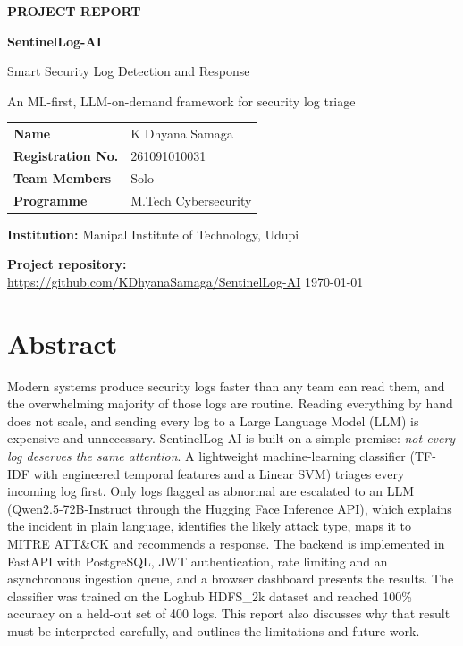 \documentclass[12pt,a4paper]{report}
\begin{document}
\begin{titlepage}
\centering
\vspace*{1.5cm}
{\Large\bfseries PROJECT REPORT\par}
\vspace{1.2cm}
{\Huge\bfseries SentinelLog-AI\par}
\vspace{0.4cm}
{\LARGE Smart Security Log Detection and Response\par}
\vspace{0.6cm}
{\large An ML-first, LLM-on-demand framework for security log triage\par}
\vspace{2cm}
\begin{tabular}{ll}
\textbf{Name} & K Dhyana Samaga\\[3pt]
\textbf{Registration No.} & 261091010031\\[3pt]
\textbf{Team Members} & Solo\\[3pt]
\textbf{Programme} & M.Tech Cybersecurity \quad %
\end{tabular}
\vspace{1.5cm}

\textbf{Institution:} Manipal Institute of Technology, Udupi \quad %
\vspace{0.5cm}

\textbf{Project repository:}\\
\url{https://github.com/KDhyanaSamaga/SentinelLog-AI}
\vfill
{\large \today}
\end{titlepage}

\chapter*{Abstract}
Modern systems produce security logs faster than any team can read them, and the overwhelming majority of those logs are routine. Reading everything by hand does not scale, and sending every log to a Large Language Model (LLM) is expensive and unnecessary. SentinelLog-AI is built on a simple premise: \emph{not every log deserves the same attention}. A lightweight machine-learning classifier (TF-IDF with engineered temporal features and a Linear SVM) triages every incoming log first. Only logs flagged as abnormal are escalated to an LLM (Qwen2.5-72B-Instruct through the Hugging Face Inference API), which explains the incident in plain language, identifies the likely attack type, maps it to MITRE ATT\&CK and recommends a response. The backend is implemented in FastAPI with PostgreSQL, JWT authentication, rate limiting and an asynchronous ingestion queue, and a browser dashboard presents the results. The classifier was trained on the Loghub HDFS\_2k dataset and reached 100\% accuracy on a held-out set of 400 logs. This report also discusses why that result must be interpreted carefully, and outlines the limitations and future work.
\end{document}
